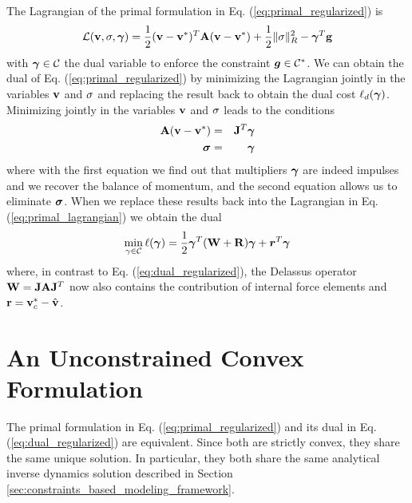 

The Lagrangian of the primal formulation in Eq. (\ref{eq:primal_regularized}) is
\begin{equation}
	\mathcal{L}(\mf{v},\mf{\sigma},\vf{\gamma}) = \frac{1}{2}(\mf{v}-\mf{v}^*)^T\mf{A}(\mf{v}-\mf{v}^*) + \frac{1}{2} \Vert\mf\sigma\Vert_{R}^2 - \vf{\gamma}^T\mf{g}
	\label{eq:primal_lagrangian}
\end{equation}
with ${\bm{\gamma}}\in\mathcal{C}$ the dual variable to enforce the constraint
${\bm{g}}\in \mathcal{C}^*$. We can obtain the dual of Eq.
(\ref{eq:primal_regularized}) by minimizing the Lagrangian jointly in the
variables ${\mathbf{v}}$ and ${\mathbf{\sigma}}$ and replacing the result back to obtain the
dual cost $\ell_d({\bm{\gamma}})$. Minimizing jointly in the variables ${\mathbf{v}}$
and ${\mathbf{\sigma}}$ leads to the conditions
\begin{eqnarray}
	{\mathbf{A}}({\mathbf{v}}-{\mathbf{v}}^*) &=& {\mathbf{J}}^T{\bm{\gamma}}\\
	{\bm{\sigma}} &=& {\bm{\gamma}}
\end{eqnarray}
where with the first equation we find out that multipliers ${\bm\gamma}$ are indeed
impulses and we recover the balance of momentum, and the second equation allows
us to eliminate ${\bm{\sigma}}$. When we replace these results back into the
Lagrangian in Eq. (\ref{eq:primal_lagrangian}) we obtain the dual
\begin{eqnarray}
	\min_{\gamma\in \mathcal{C}} \ell({\bm\gamma}) =
	\frac{1}{2}{\bm\gamma}^T(\mathbf{W}+\mathbf{R}){\bm\gamma} + {\bm r}^T
	{\bm\gamma}
\end{eqnarray}
where, in contrast to Eq. (\ref{eq:dual_regularized}), the Delassus operator
${\mathbf{W}}={\mathbf{J}}{\mathbf{A}}{\mathbf{J}}^T$ now also contains the contribution of internal
force elements and ${\mathbf{r}}={\mathbf{v}}_c^*-\hat{{\mathbf{v}}}$.

\section{An Unconstrained Convex Formulation}
\label{sec:unconstrained_convex_formulation}

The primal formulation in Eq. (\ref{eq:primal_regularized}) and its dual in Eq.
(\ref{eq:dual_regularized}) are equivalent. Since both are strictly convex, they
share the same unique solution. In particular, they both share the same
analytical inverse dynamics solution described in Section
\ref{sec:constraints_based_modeling_framework}.

